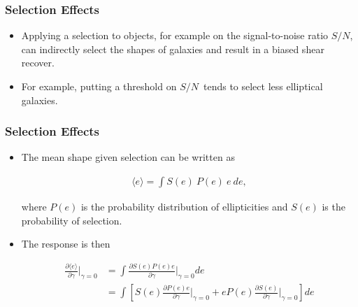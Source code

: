 \documentclass{beamer}
\newcommand{\snr}{$S/N$}
\newcommand{\mest}{e}
\begin{document}
\frame
{
    \frametitle{Selection Effects}


    \begin{itemize}

        \item  Applying a selection to objects, for example on the signal-to-noise
            ratio \snr, can indirectly select the shapes of galaxies and result
            in a biased shear recover.

        \item For example, putting a threshold on \snr\ tends to select less
            elliptical galaxies.

    \end{itemize}

}
\frame
{
    \frametitle{Selection Effects}

 
    \begin{itemize}


        \item The mean shape given selection can be written as

            \begin{align}
                \langle \mest \rangle = \int S(\mest)~P(\mest)~\mest~d\mest,
            \end{align}

            where $P(e)$ is the probability distribution of ellipticities
            and $S(e)$ is the probability of selection.

        \item The response is then

            \begin{align}
                \frac{\partial \langle \mest \rangle}{\partial \gamma}\bigg|_{\gamma=0} 
                &= \int \frac{\partial S(\mest) P(\mest) \mest  }{\partial \gamma}\bigg|_{\gamma=0} d\mest \nonumber \\
                &= \int \left[ S(\mest) \frac{\partial  P(\mest) \mest  }{\partial \gamma}\bigg|_{\gamma=0} + \mest P(\mest) \frac{\partial S(\mest)}{\partial \gamma}\bigg|_{\gamma=0} \right] d\mest \\
            \end{align}


\end{itemize}}
\end{document}
